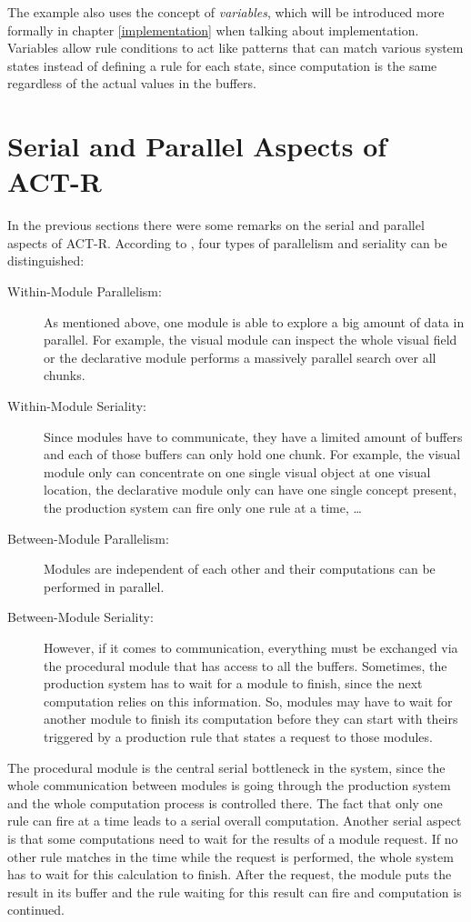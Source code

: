 The example also uses the concept of \emph{variables}, which will be introduced more formally in chapter \ref{implementation} when talking about implementation. Variables allow rule conditions to act like patterns that can match various system states instead of defining a rule for each state, since computation is the same regardless of the actual values in the buffers.

\section{Serial and Parallel Aspects of ACT-R}
\label{serial_parallel_aspects}

In the previous sections there were some remarks on the serial and parallel aspects of ACT-R. According to \cite[p. 68]{anderson_how_2007}, four types of parallelism and seriality can be distinguished:

\begin{description}
 \item[Within-Module Parallelism:] As mentioned above, one module is able to explore a big amount of data in parallel. For example, the visual module can inspect the whole visual field or the declarative module performs a massively parallel search over all chunks.
 \item[Within-Module Seriality:] Since modules have to communicate, they have a limited amount of buffers and each of those buffers can only hold one chunk. For example, the visual module only can concentrate on one single visual object at one visual location, the declarative module only can have one single concept present, the production system can fire only one rule at a time, \dots 
 \item[Between-Module Parallelism:] Modules are independent of each other and their computations can be performed in parallel.
 \item[Between-Module Seriality:] However, if it comes to communication, everything must be exchanged via the procedural module that has access to all the buffers. Sometimes, the production system has to wait for a module to finish, since the next computation relies on this information. So, modules may have to wait for another module to finish its computation before they can start with theirs triggered by a production rule that states a request to those modules.
\end{description}

The procedural module is the central serial bottleneck in the system, since the whole communication between modules is going through the production system and the whole computation process is controlled there. The fact that only one rule can fire at a time leads to a serial overall computation. Another serial aspect is that some computations need to wait for the results of a module request. If no other rule matches in the time while the request is performed, the whole system has to wait for this calculation to finish. After the request, the module puts the result in its buffer and the rule waiting for this result can fire and computation is continued.


